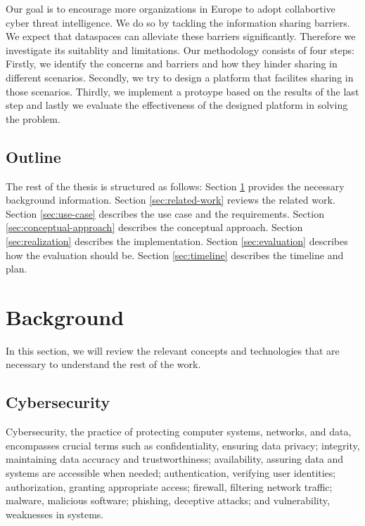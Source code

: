 \documentclass{article}
\begin{document}

% 

Our goal is to encourage more organizations in Europe to adopt collabortive cyber threat intelligence. We do so by tackling the information sharing barriers. We expect that dataspaces can alleviate these barriers significantly. Therefore we investigate its suitablity and limitations. Our methodology consists of four steps: Firstly, we identify the concerns and barriers and how they hinder sharing in different scenarios. Secondly, we try to design a platform that facilites sharing in those scenarios. Thirdly, we implement a protoype based on the results of the last step and lastly we evaluate the effectiveness of the designed platform in solving the problem.

\subsection{Outline}

The rest of the thesis is structured as follows: Section \ref{sec:background} provides the necessary background information. Section \ref{sec:related-work} reviews the related work. Section \ref{sec:use-case} describes the use case and the requirements. Section \ref{sec:conceptual-approach} describes the conceptual approach. Section \ref{sec:realization} describes the implementation. Section \ref{sec:evaluation} describes how the evaluation should be. Section \ref{sec:timeline} describes the timeline and plan.

\section{Background} %
\label{sec:background}
In this section, we will review the relevant concepts and technologies that are necessary to understand the rest of the work.

\subsection{Cybersecurity}

Cybersecurity, the practice of protecting computer systems, networks, and data, encompasses crucial terms such as confidentiality, ensuring data privacy; integrity, maintaining data accuracy and trustworthiness; availability, assuring data and systems are accessible when needed; authentication, verifying user identities; authorization, granting appropriate access; firewall, filtering network traffic; malware, malicious software; phishing, deceptive attacks; and vulnerability, weaknesses in systems.
\end{document}
